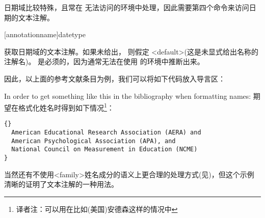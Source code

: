 \begin{ltxsyntax}

日期域比较特殊，且常在 无法访问的环境中处理，因此需要第四个命令来访问日期的文本注解。

[annotationname]{datetype}


获取日期域的文本注解。如果未给出，
则假定 <default>(这是未显式给出名称的注解名)。
 是必须的，因为通常无法在使用  的环境中推断出来。

\end{ltxsyntax}
%
因此，以上面的参考文献条目为例，我们可以将如下代码放入导言区：

\begin{ltxexample}[style=latex]
\renewcommand*{\mkbibnamefamily}[1]{%
  #1\space\mkbibparens{\getpartannotation{family}}}
\end{ltxexample}
%
In order to get something like this in the bibliography when formatting names:
期望在格式化姓名时得到如下情况\footnote{译者注：可以用在比如(美国)安德森这样的情况中}：

\begin{lstlisting}[style=bibtex]{}
  American Educational Research Association (AERA) and
  American Psychological Association (APA), and
  National Council on Measurement in Education (NCME)
}
\end{lstlisting}
%


当然还有不使用<family>姓名成分的语义上更合理的处理方式(见)，但这个示例清晰的证明了文本注解的一种用法。

